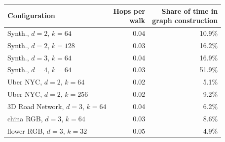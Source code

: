 \begin{tabular}{lrr}
\toprule
Configuration & \shortstack[r]{Hops per\\ walk} & \shortstack[r]{Share of time in\\ graph construction} \\
\midrule
Synth., $d{=}2$, $k{=}64$ & 0.04 & 10.9\% \\
Synth., $d{=}2$, $k{=}128$ & 0.03 & 16.2\% \\
Synth., $d{=}3$, $k{=}64$ & 0.04 & 16.9\% \\
Synth., $d{=}4$, $k{=}64$ & 0.03 & 51.9\% \\
Uber NYC, $d{=}2$, $k{=}64$ & 0.02 & 5.1\% \\
Uber NYC, $d{=}2$, $k{=}256$ & 0.02 & 9.2\% \\
3D Road Network, $d{=}3$, $k{=}64$ & 0.04 & 6.2\% \\
china RGB, $d{=}3$, $k{=}64$ & 0.03 & 8.6\% \\
flower RGB, $d{=}3$, $k{=}32$ & 0.05 & 4.9\% \\
\bottomrule
\end{tabular}
